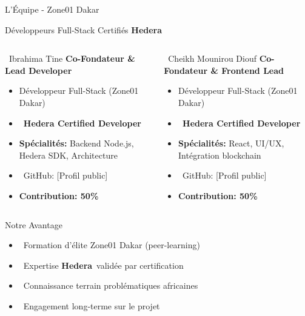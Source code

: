 \documentclass[aspectratio=169,11pt]{beamer}
\newcommand{\hedera}{\textbf{Hedera}\texttrademark}
\begin{document}
\begin{frame}{L'Équipe - Zone01 Dakar}

\begin{block}{Développeurs Full-Stack Certifiés \hedera}
\vspace{0.3cm}

\begin{columns}[T]
\begin{exampleblock}{\faUser~Ibrahima Tine}
\textbf{Co-Fondateur \& Lead Developer}
\begin{itemize}
    \item Développeur Full-Stack (Zone01 Dakar)
    \item \textcolor{successGreen}{\faAward~\textbf{Hedera Certified Developer}}
    \item \textbf{Spécialités:} Backend Node.js, Hedera SDK, Architecture
    \item \faGithub~GitHub: [Profil public]
    \item \textbf{Contribution: 50\%}
\end{itemize}
\end{exampleblock}

\begin{exampleblock}{\faUser~Cheikh Mounirou Diouf}
\textbf{Co-Fondateur \& Frontend Lead}
\begin{itemize}
    \item Développeur Full-Stack (Zone01 Dakar)
    \item \textcolor{successGreen}{\faAward~\textbf{Hedera Certified Developer}}
    \item \textbf{Spécialités:} React, UI/UX, Intégration blockchain
    \item \faGithub~GitHub: [Profil public]
    \item \textbf{Contribution: 50\%}
\end{itemize}
\end{exampleblock}
\end{columns}
\end{block}

\vspace{0.3cm}

\begin{columns}[T]
\begin{block}{Notre Avantage}
\small
\begin{itemize}
    \item \faGraduationCap~Formation d'élite Zone01 Dakar (peer-learning)
    \item \faCheckCircle~Expertise \hedera~validée par certification
    \item \faMapMarkerAlt~Connaissance terrain problématiques africaines
    \item \faHeart~Engagement long-terme sur le projet
\end{itemize}
\end{block}


\end{columns}
\end{frame}
\end{document}
